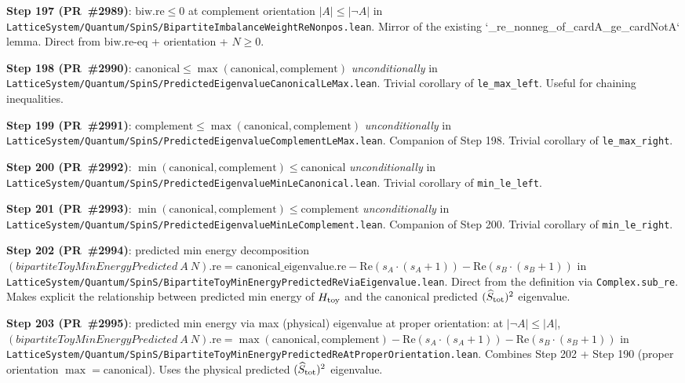 \documentclass[a4paper,11pt]{article}
\begin{document}
\textbf{Step 197 (PR~\#2989)}: $\mathrm{biw.re} \le 0$ at complement
orientation $|A| \le |\neg A|$ in
\texttt{LatticeSystem/Quantum/SpinS/BipartiteImbalanceWeightReNonpos.lean}.
Mirror of the existing `\_re\_nonneg\_of\_cardA\_ge\_cardNotA` lemma.
Direct from $\mathrm{biw.re}$-eq + orientation + $N \ge 0$.

\textbf{Step 198 (PR~\#2990)}: $\mathrm{canonical} \le
\max(\mathrm{canonical}, \mathrm{complement})$ \emph{unconditionally}
in
\texttt{LatticeSystem/Quantum/SpinS/PredictedEigenvalueCanonicalLeMax.lean}.
Trivial corollary of \texttt{le\_max\_left}. Useful for chaining
inequalities.

\textbf{Step 199 (PR~\#2991)}: $\mathrm{complement} \le
\max(\mathrm{canonical}, \mathrm{complement})$ \emph{unconditionally}
in
\texttt{LatticeSystem/Quantum/SpinS/PredictedEigenvalueComplementLeMax.lean}.
Companion of Step 198. Trivial corollary of \texttt{le\_max\_right}.

\textbf{Step 200 (PR~\#2992)}:
$\min(\mathrm{canonical}, \mathrm{complement}) \le \mathrm{canonical}$
\emph{unconditionally} in
\texttt{LatticeSystem/Quantum/SpinS/PredictedEigenvalueMinLeCanonical.lean}.
Trivial corollary of \texttt{min\_le\_left}.

\textbf{Step 201 (PR~\#2993)}:
$\min(\mathrm{canonical}, \mathrm{complement}) \le \mathrm{complement}$
\emph{unconditionally} in
\texttt{LatticeSystem/Quantum/SpinS/PredictedEigenvalueMinLeComplement.lean}.
Companion of Step 200. Trivial corollary of \texttt{min\_le\_right}.

\textbf{Step 202 (PR~\#2994)}: predicted min energy decomposition
$(bipartiteToyMinEnergyPredicted\ A\ N).\mathrm{re} =
\mathrm{canonical\_eigenvalue.re} -
\mathrm{Re}(s_A\cdot(s_A+1)) - \mathrm{Re}(s_B\cdot(s_B+1))$ in
\texttt{LatticeSystem/Quantum/SpinS/BipartiteToyMinEnergyPredictedReViaEigenvalue.lean}.
Direct from the definition via \texttt{Complex.sub\_re}. Makes
explicit the relationship between predicted min energy of $H_{\rm toy}$
and the canonical predicted $(\widehat S_{\rm tot})^2$ eigenvalue.

\textbf{Step 203 (PR~\#2995)}: predicted min energy via max (physical)
eigenvalue at proper orientation: at $|\neg A| \le |A|$,
$(bipartiteToyMinEnergyPredicted\ A\ N).\mathrm{re} =
\max(\mathrm{canonical}, \mathrm{complement}) -
\mathrm{Re}(s_A\cdot(s_A+1)) - \mathrm{Re}(s_B\cdot(s_B+1))$ in
\texttt{LatticeSystem/Quantum/SpinS/BipartiteToyMinEnergyPredictedReAtProperOrientation.lean}.
Combines Step 202 + Step 190 (proper orientation $\max = \mathrm{canonical}$).
Uses the physical predicted $(\widehat S_{\rm tot})^2$ eigenvalue.
\end{document}
